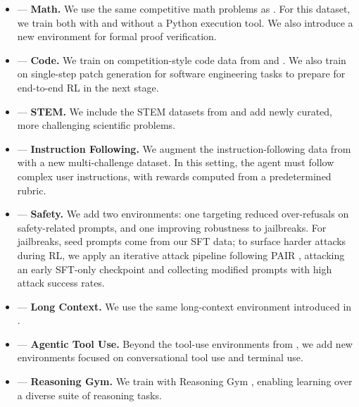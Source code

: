 \begin{itemize}
    \item[] --- \textbf{Math.} We use the same competitive math problems as \nanomodel. For this dataset, we train both with and without a Python execution tool. We also introduce a new environment for formal proof verification.
    \item[] --- \textbf{Code.} We train on competition-style code data from \nanomodel and \citet{wang2025nemotroncascadescalingcascadedreinforcement}. We also train on single-step patch generation for software engineering tasks to prepare for end-to-end RL in the next stage.
    \item[] --- \textbf{STEM.} We include the STEM datasets from \nanomodel and add newly curated, more challenging scientific problems.
    \item[] --- \textbf{Instruction Following.} We augment the instruction-following data from \nanomodel with a new multi-challenge dataset. In this setting, the agent must follow complex user instructions, with rewards computed from a predetermined rubric.
    \item[] --- \textbf{Safety.} We add two environments: one targeting reduced over-refusals on safety-related prompts, and one improving robustness to jailbreaks. For jailbreaks, seed prompts come from our SFT data; to surface harder attacks during RL, we apply an iterative attack pipeline following PAIR \citep{chao2024jailbreakingblackboxlarge}, attacking an early SFT-only checkpoint and collecting modified prompts with high attack success rates.
    \item[] --- \textbf{Long Context.} We use the same long-context environment introduced in \nanomodel.
    \item[] --- \textbf{Agentic Tool Use.} Beyond the tool-use environments from \nanomodel, we add new environments focused on conversational tool use and terminal use.
    \item[] --- \textbf{Reasoning Gym.} We train with Reasoning Gym \citep{stojanovski2025reasoning}, enabling learning over a diverse suite of reasoning tasks.
\end{itemize}



